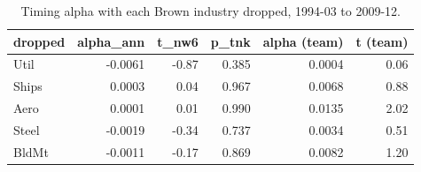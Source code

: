 \begin{table}[htbp]\centering\small
\caption{Timing alpha with each Brown industry dropped, 1994-03 to 2009-12.}
\label{tab:m8_drop_one}
\begin{tabular}{lrrrrr}
\toprule
dropped & alpha\_ann & t\_nw6 & p\_tnk & alpha (team) & t (team) \\
\midrule
Util & -0.0061 & -0.87 & 0.385 & 0.0004 & 0.06 \\
Ships & 0.0003 & 0.04 & 0.967 & 0.0068 & 0.88 \\
Aero & 0.0001 & 0.01 & 0.990 & 0.0135 & 2.02 \\
Steel & -0.0019 & -0.34 & 0.737 & 0.0034 & 0.51 \\
BldMt & -0.0011 & -0.17 & 0.869 & 0.0082 & 1.20 \\
\bottomrule
\end{tabular}
\end{table}
